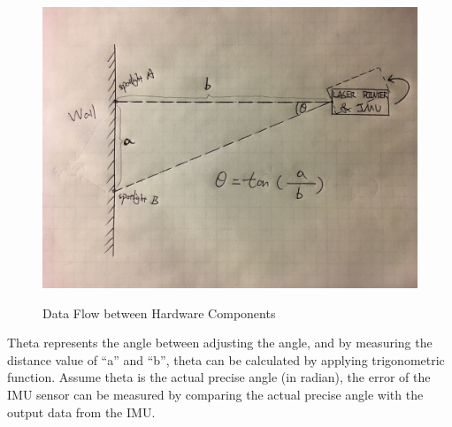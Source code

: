 \begin{figure}
	\centering
 		\caption{Data Flow between Hardware Components}
      	\includegraphics[width=\textwidth,height=\textheight,keepaspectratio]{img/draft}
    \label{fig:draft}
\end{figure}

Theta represents the angle between adjusting the angle, and by measuring the distance value of “a” and “b”, theta can be calculated by applying trigonometric function. Assume theta is the actual precise angle (in radian), the error of the IMU sensor can be measured by comparing the actual precise angle with the output data from the IMU.






